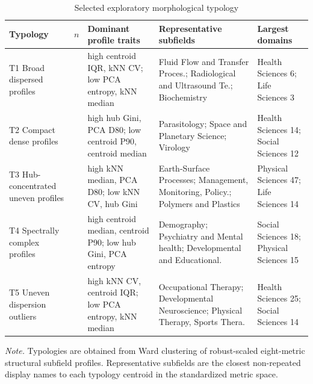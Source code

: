 \begin{table}[H]
\centering
\caption[Morphological typology summary]{Selected exploratory morphological typology}
\label{tab:typology_summary}
\scriptsize
\begingroup
\setlength{\tabcolsep}{2.4pt}
\begin{tabular}{@{}>{\raggedright\arraybackslash}p{} >{\raggedleft\arraybackslash}p{} >{\raggedright\arraybackslash}p{} >{\raggedright\arraybackslash}p{} >{\raggedright\arraybackslash}p{}@{}}
\hline
\textbf{Typology} & \textbf{$n$} & \textbf{Dominant profile traits} & \textbf{Representative subfields} & \textbf{Largest domains} \\
\hline
T1 Broad dispersed profiles & 11 & high centroid IQR, kNN CV; low PCA entropy, kNN median & Fluid Flow and Transfer Proces.; Radiological and Ultrasound Te.; Biochemistry & Health Sciences 6; Life Sciences 3 \\
T2 Compact dense profiles & 40 & high hub Gini, PCA D80; low centroid P90, centroid median & Parasitology; Space and Planetary Science; Virology & Health Sciences 14; Social Sciences 12 \\
T3 Hub-concentrated uneven profiles & 82 & high kNN median, PCA D80; low kNN CV, hub Gini & Earth-Surface Processes; Management, Monitoring, Policy.; Polymers and Plastics & Physical Sciences 47; Life Sciences 14 \\
T4 Spectrally complex profiles & 44 & high centroid median, centroid P90; low hub Gini, PCA entropy & Demography; Psychiatry and Mental health; Developmental and Educational. & Social Sciences 18; Physical Sciences 15 \\
T5 Uneven dispersion outliers & 64 & high kNN CV, centroid IQR; low PCA entropy, kNN median & Occupational Therapy; Developmental Neuroscience; Physical Therapy, Sports Thera. & Health Sciences 25; Social Sciences 14 \\
\hline
\end{tabular}
\endgroup
\par\vspace{0.15cm}
\footnotesize\textit{Note.} Typologies are obtained from Ward clustering of robust-scaled eight-metric structural subfield profiles. Representative subfields are the closest non-repeated display names to each typology centroid in the standardized metric space.
\end{table}
